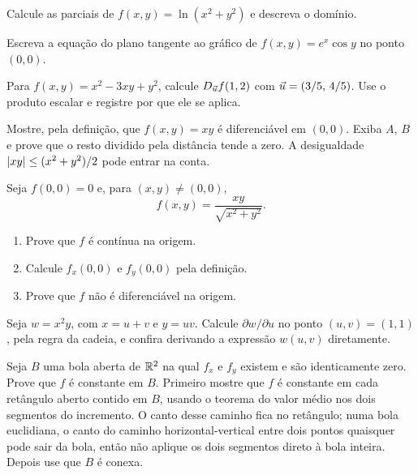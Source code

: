 \documentclass[11pt,a4paper]{article}
\begin{document}
\begin{exercicio}
Calcule as parciais de $f(x,y)=\ln(x^2+y^2)$ e descreva o domínio.
\end{exercicio}

\begin{exercicio}
Escreva a equação do plano tangente ao gráfico de $f(x,y)=e^x\cos y$ no ponto $(0,0)$.
\end{exercicio}

\begin{exercicio}
Para $f(x,y)=x^2-3xy+y^2$, calcule $D_{\vec{u}} f(1,2)$ com $\vec{u}=(3/5,\,4/5)$. Use o produto escalar e registre por que ele se aplica.
\end{exercicio}

\begin{exercicio}
Mostre, pela definição, que $f(x,y)=xy$ é diferenciável em $(0,0)$. Exiba $A$, $B$ e prove que o resto dividido pela distância tende a zero. A desigualdade $\left\lvert xy \right\rvert\le(x^2+y^2)/2$ pode entrar na conta.
\end{exercicio}

\begin{exercicio}
Seja $f(0,0)=0$ e, para $(x,y)\neq(0,0)$,
\[
f(x,y)=\frac{xy}{\sqrt{x^2+y^2}}.
\]
\begin{enumerate}[label=\alph*)]
\item Prove que $f$ é contínua na origem.
\item Calcule $f_x(0,0)$ e $f_y(0,0)$ pela definição.
\item Prove que $f$ não é diferenciável na origem.
\end{enumerate}
\end{exercicio}

\begin{exercicio}
Seja $w=x^2 y$, com $x=u+v$ e $y=uv$. Calcule $\partial w/\partial u$ no ponto $(u,v)=(1,1)$, pela regra da cadeia, e confira derivando a expressão $w(u,v)$ diretamente.
\end{exercicio}

\begin{exercicio}
Seja $B$ uma bola aberta de $\mathbb{R}^2$ na qual $f_x$ e $f_y$ existem e são identicamente zero. Prove que $f$ é constante em $B$. Primeiro mostre que $f$ é constante em cada retângulo aberto contido em $B$, usando o teorema do valor médio nos dois segmentos do incremento. O canto desse caminho fica no retângulo; numa bola euclidiana, o canto do caminho horizontal-vertical entre dois pontos quaisquer pode sair da bola, então não aplique os dois segmentos direto à bola inteira. Depois use que $B$ é conexa.
\end{exercicio}
\end{document}
